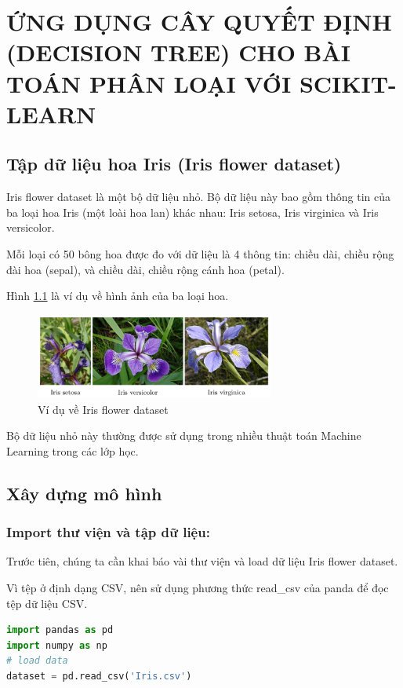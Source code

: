 \chapter{ỨNG DỤNG CÂY QUYẾT ĐỊNH (DECISION TREE)
CHO BÀI TOÁN PHÂN LOẠI VỚI SCIKIT-LEARN}

\section{Tập dữ liệu hoa Iris (Iris flower dataset)}
Iris flower dataset là một bộ dữ liệu nhỏ. Bộ dữ liệu này bao gồm
thông tin của ba loại hoa Iris (một loài hoa lan) khác nhau:
Iris setosa, Iris virginica và Iris versicolor.

Mỗi loại có 50 bông hoa được đo với dữ liệu là 4 thông tin:
chiều dài, chiều rộng đài hoa (sepal), và chiều dài, chiều rộng cánh hoa (petal).

Hình \ref{fig:iris} là ví dụ về hình ảnh của ba loại hoa.

\begin{figure}[h!]
    \centering
    \includegraphics[width=0.7\textwidth]{thesis/decision-tree/app/iris.png}
    \caption{Ví dụ về Iris flower dataset}
    \label{fig:iris}
\end{figure}

Bộ dữ liệu nhỏ này thường được sử dụng trong nhiều thuật toán
Machine Learning trong các lớp học.

\section{Xây dựng mô hình}

\subsection{Import thư viện và tập dữ liệu:}

Trước tiên, chúng ta cần khai báo vài thư viện và load dữ liệu Iris flower dataset.

Vì tệp ở định dạng CSV, nên sử dụng phương thức read\_csv của panda để đọc tệp dữ liệu CSV.

\begin{lstlisting}[language=Python]
import pandas as pd
import numpy as np
# load data
dataset = pd.read_csv('Iris.csv')
\end{lstlisting}

